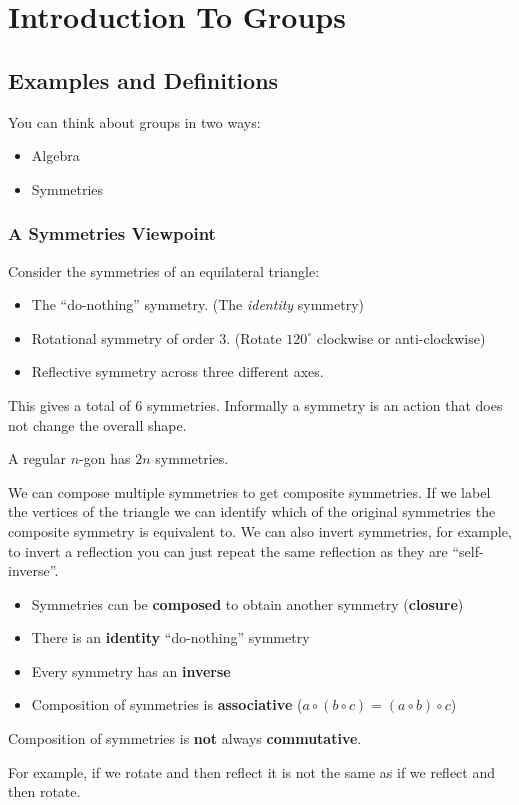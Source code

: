\documentclass[../main.tex]{subfiles}
\begin{document}
\chapter{Introduction To Groups}
\section{Examples and Definitions}
You can think about groups in two ways:
\begin{itemize}
  \item Algebra
  \item Symmetries
\end{itemize}
\subsection{A Symmetries Viewpoint}
Consider the symmetries of an equilateral triangle:
\begin{itemize}
  \item The ``do-nothing'' symmetry. (The \textit{identity} symmetry)
  \item Rotational symmetry of order 3. (Rotate $120^\circ$ clockwise or anti-clockwise)
  \item Reflective symmetry across three different axes.
\end{itemize}
This gives a total of 6 symmetries.
Informally a symmetry is an action that does not change the overall shape.
\begin{remark}
  A regular $n$-gon has $2n$ symmetries.
\end{remark}
We can compose multiple symmetries to get composite symmetries.
If we label the vertices of the triangle we can identify which of the original symmetries the composite symmetry is equivalent to.
We can also invert symmetries, for example, to invert a reflection you can just repeat the same reflection as they are ``self-inverse''.
\begin{remark}
  \begin{itemize}
    \item Symmetries can be \textbf{composed} to obtain another symmetry (\textbf{closure})
    \item There is an \textbf{identity} ``do-nothing'' symmetry
    \item Every symmetry has an \textbf{inverse}
    \item Composition of symmetries is \textbf{associative} ($a \circ (b \circ c) = (a \circ b) \circ c$)
  \end{itemize}
\end{remark}
\begin{remark}[Warning]
  Composition of symmetries is \textbf{not} always \textbf{commutative}.

  For example, if we rotate and then reflect it is not the same as if we reflect and then rotate.
\end{remark}
\end{document}
